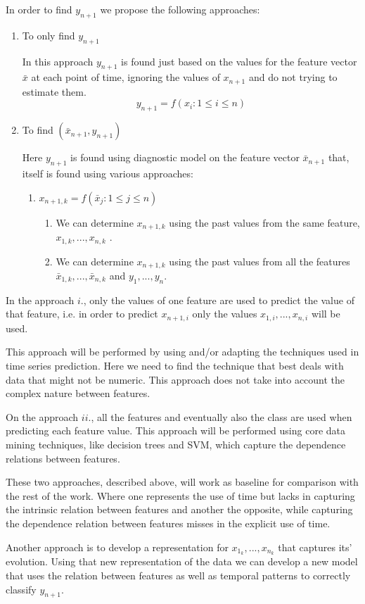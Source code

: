 In order to find $y_{n+1}$ we propose the following approaches:
\begin{enumerate}
\item{ To only find $y_{n+1}$

In this approach $y_{n+1}$ is found just based on the values for the feature vector $\bar{x}$ at each point of time, ignoring the values of $x_{n+1}$
  and do not trying to estimate them.
\begin{equation}
	y_{n+1} = f(x_{i} :1 \leq i \leq n)
\label{eq:approach1}
\end{equation}
  }
\item{ To find $(\bar{x}_{n+1},y_{n+1})$
	
Here  $y_{n+1}$ is found using diagnostic model on the feature vector $\bar{x}_{n+1}$ that, itself is found using various approaches:
	\begin{enumerate}
		\item{ $x_{n+1,k}=f(\bar{x}_j:1\leq j \leq n)$
		\begin{enumerate}
			\item{We can determine $x_{n+1,k}$ using the past values from the same feature, $x_{1,k},..., x_{n,k}$ . }
			\item{We can determine $x_{n+1,k}$ using the past values from all the features $\bar{x}_{1,k},..., \bar{x}_{n,k}$ and $y_1,...,y_n$.}
		\end{enumerate}
		}
	\end{enumerate}
}
\end{enumerate}

In the approach $i.$, only the values of one feature are used to predict the value of that feature, i.e. in order to predict $x_{n+1,i}$ only 
the values $x_{1,i},..., x_{n,i}$ will be used. 

This approach will be performed by using and/or adapting the techniques used in time series prediction. Here we need to find the technique 
that best deals with data that might not be numeric. This approach does not take into account the complex nature between features. 

On the approach $ii.$, all the features and eventually also the class are used when predicting each feature value. This approach will be 
performed using core data mining techniques, like decision trees and SVM, which capture the dependence relations between features.

These two approaches, described above, will work as baseline for comparison with the rest of the work. Where one represents the use of 
time but lacks in capturing the intrinsic relation between features and another the opposite, while capturing the dependence relation 
between features misses in the explicit use of time.

Another approach is to develop a representation for $x_{1_k},...,x_{n_k}$ that captures its’ evolution. Using that new representation of the 
data we can develop a new model that uses the relation between features as well as temporal patterns to correctly classify $y_{n+1}$.